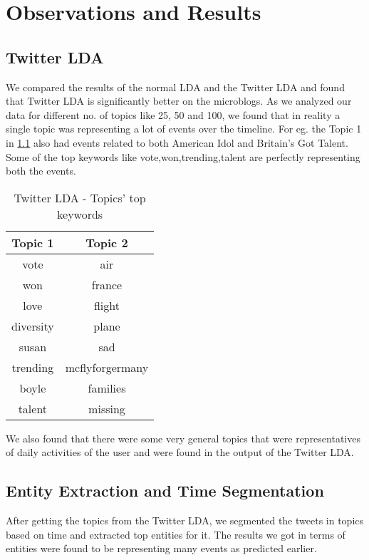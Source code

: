 \chapter{Observations and Results}


\section{Twitter LDA}
We compared the results of the normal LDA and the Twitter LDA and found that Twitter LDA is significantly better on the microblogs. As we analyzed our data for different no. of topics like 25, 50 and 100, we found that in reality a single topic was representing a lot of events over the timeline. For eg. the Topic 1 in \ref{table:twitterlda} also had events related to both American Idol and Britain's Got Talent. Some of the top keywords like vote,won,trending,talent are perfectly representing both the events. 

\begin{table}[h!]
\centering
\begin{tabular}{ c c }
Topic 1 & Topic 2 \\
\hline
vote & air	 \\
won & france	 \\
love & flight	 \\
diversity &	plane	 \\
susan & sad	 \\
trending & mcflyforgermany	 \\
boyle &	families	 \\
talent & missing	
\end{tabular}
\caption{Twitter LDA - Topics' top keywords}
\label{table:twitterlda}
\end{table}

We also found that there were some very general topics that were representatives of daily activities of the user and were found in the output of the Twitter LDA.

\section{Entity Extraction and Time Segmentation}
After getting the topics from the Twitter LDA, we segmented the tweets in topics based on time and extracted top entities for it. The results we got in terms of entities were found to be representing many events as predicted earlier.

